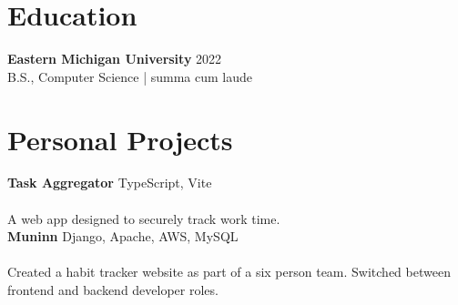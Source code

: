 \documentclass[11pt]{article}
\begin{document}
\section*{Education}
\textbf{Eastern Michigan University} \hfill 2022\\
B.S., Computer Science  | summa cum laude


\section*{Personal Projects}

\textbf{Task Aggregator} TypeScript, Vite\\
\href{https://github.com/coxender/task-aggregator}\\
 A web app designed to securely track work time.   \\

\textbf{Muninn}  Django, Apache, AWS, MySQL\\
\href{https://github.com/coxender/Muninn}\\
Created a habit tracker website as part of a six person team.  Switched between frontend and backend developer roles.\\
\end{document}
